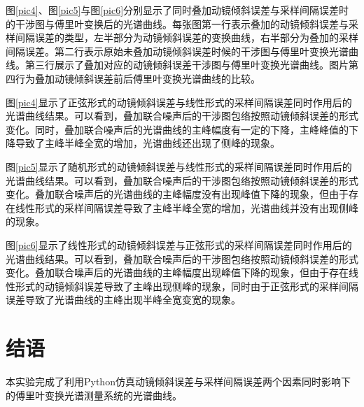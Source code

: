 \documentclass[conference]{IEEEtran}
\begin{document}
图\ref{pic4}、图\ref{pic5}与图\ref{pic6}分别显示了同时叠加动镜倾斜误差与采样间隔误差时的干涉图与傅里叶变换后的光谱曲线。每张图第一行表示叠加的动镜倾斜误差与采样间隔误差的类型，左半部分为动镜倾斜误差的变换曲线，右半部分为叠加的采样间隔误差。第二行表示原始未叠加动镜倾斜误差时候的干涉图与傅里叶变换光谱曲线。第三行展示了叠加对应的动镜倾斜误差干涉图与傅里叶变换光谱曲线。图片第四行为叠加动镜倾斜误差前后傅里叶变换光谱曲线的比较。

图\ref{pic4}显示了正弦形式的动镜倾斜误差与线性形式的采样间隔误差同时作用后的光谱曲线结果。可以看到，叠加联合噪声后的干涉图包络按照动镜倾斜误差的形式变化。同时，叠加联合噪声后的光谱曲线的主峰幅度有一定的下降，主峰峰值的下降导致了主峰半峰全宽的增加，光谱曲线还出现了侧峰的现象。

图\ref{pic5}显示了随机形式的动镜倾斜误差与线性形式的采样间隔误差同时作用后的光谱曲线结果。可以看到，叠加联合噪声后的干涉图包络按照动镜倾斜误差的形式变化。叠加联合噪声后的光谱曲线的主峰幅度没有出现峰值下降的现象，但由于存在线性形式的采样间隔误差导致了主峰半峰全宽的增加，光谱曲线并没有出现侧峰的现象。

图\ref{pic6}显示了线性形式的动镜倾斜误差与正弦形式的采样间隔误差同时作用后的光谱曲线结果。可以看到，叠加联合噪声后的干涉图包络按照动镜倾斜误差的形式变化。叠加联合噪声后的光谱曲线的主峰幅度出现峰值下降的现象，但由于存在线性形式的动镜倾斜误差导致了主峰出现侧峰的现象，同时由于正弦形式的采样间隔误差导致了光谱曲线的主峰出现半峰全宽变宽的现象。

\section{结语}
本实验完成了利用Python仿真动镜倾斜误差与采样间隔误差两个因素同时影响下的傅里叶变换光谱测量系统的光谱曲线。
\end{document}
